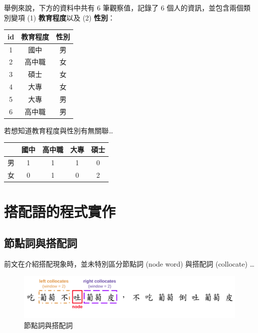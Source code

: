 舉例來說，下方的資料中共有 6 筆觀察值，記錄了 6
個人的資訊，並包含兩個類別變項 (1) \textbf{教育程度}以及 (2)
\textbf{性別}：

\begin{longtable}[]{@{}ccc@{}}
\toprule()
id & 教育程度 & 性別 \\
\midrule()
\endhead
1 & 國中 & 男 \\
2 & 高中職 & 女 \\
3 & 碩士 & 女 \\
4 & 大專 & 女 \\
5 & 大專 & 男 \\
6 & 高中職 & 男 \\
\bottomrule()
\end{longtable}

若想知道教育程度與性別有無關聯\ldots{}

\begin{longtable}[]{@{}ccccc@{}}
\toprule()
& 國中 & 高中職 & 大專 & 碩士 \\
\midrule()
\endhead
男 & 1 & 1 & 1 & 0 \\
女 & 0 & 1 & 0 & 2 \\
\bottomrule()
\end{longtable}

\hypertarget{ux642dux914dux8a9eux7684ux7a0bux5f0fux5be6ux4f5c}{%
\section{搭配語的程式實作}\label{ux642dux914dux8a9eux7684ux7a0bux5f0fux5be6ux4f5c}}

\hypertarget{ux7bc0ux9edeux8a5eux8207ux642dux914dux8a5e}{%
\subsection{節點詞與搭配詞}\label{ux7bc0ux9edeux8a5eux8207ux642dux914dux8a5e}}

前文在介紹搭配現象時，並未特別區分節點詞 (node word)
 與搭配詞 (collocate)
 \ldots{}

\begin{figure}
\hypertarget{fig:ch07-sliding-window-0}{%
\centering
\includegraphics{figures/ch07_collocation_window.png}
\caption{節點詞與搭配詞}\label{fig:ch07-sliding-window-0}
}
\end{figure}

